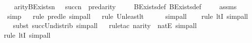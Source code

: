 \begin{isabellebody}
\ \ \ {\isachardoublequoteopen}arity{\isacharparenleft}{\kern0pt}BExists{\isacharparenleft}{\kern0pt}n{\isacharcomma}{\kern0pt}\ {\isasymphi}{\isacharparenright}{\kern0pt}{\isacharparenright}{\kern0pt}\ {\isasymle}\ succ{\isacharparenleft}{\kern0pt}n{\isacharparenright}{\kern0pt}\ {\isasymunion}\ pred{\isacharparenleft}{\kern0pt}arity{\isacharparenleft}{\kern0pt}{\isasymphi}{\isacharparenright}{\kern0pt}{\isacharparenright}{\kern0pt}{\isachardoublequoteclose}\ \isanewline
%
\isadelimproof
\isanewline
\ \ %
\endisadelimproof
%
\isatagproof
{}\isamarkupfalse%
\ BExists{\isacharunderscore}{\kern0pt}def\ BExists{\isacharprime}{\kern0pt}{\isacharunderscore}{\kern0pt}def\ \isanewline
\ \ \isamarkupfalse%
\ assms\isanewline
\ \ \isamarkupfalse%
\ simp\isanewline
\ \ \isamarkupfalse%
{\isacharparenleft}{\kern0pt}rule\ pred{\isacharunderscore}{\kern0pt}le{\isacharcomma}{\kern0pt}\ simp{\isacharunderscore}{\kern0pt}all{\isacharparenright}{\kern0pt}\isanewline
\ \ \isamarkupfalse%
{\isacharparenleft}{\kern0pt}rule\ Un{\isacharunderscore}{\kern0pt}least{\isacharunderscore}{\kern0pt}lt{\isacharparenright}{\kern0pt}{\isacharplus}{\kern0pt}\isanewline
\ \ \ \ \isamarkupfalse%
\ simp{\isacharunderscore}{\kern0pt}all\isanewline
\ \ \ \isamarkupfalse%
{\isacharparenleft}{\kern0pt}rule\ ltI{\isacharcomma}{\kern0pt}\ simp{\isacharunderscore}{\kern0pt}all{\isacharparenright}{\kern0pt}\isanewline
\ \ \isamarkupfalse%
{\isacharparenleft}{\kern0pt}subst\ succ{\isacharunderscore}{\kern0pt}Un{\isacharunderscore}{\kern0pt}distrib{\isacharcomma}{\kern0pt}\ simp{\isacharunderscore}{\kern0pt}all{\isacharparenright}{\kern0pt}\isanewline
\ \ \isamarkupfalse%
{\isacharparenleft}{\kern0pt}rule{\isacharunderscore}{\kern0pt}tac\ n{\isacharequal}{\kern0pt}{\isachardoublequoteopen}arity{\isacharparenleft}{\kern0pt}{\isasymphi}{\isacharparenright}{\kern0pt}{\isachardoublequoteclose}\ \ natE{\isacharcomma}{\kern0pt}\ simp{\isacharunderscore}{\kern0pt}all{\isacharparenright}{\kern0pt}\isanewline
\ \ \isamarkupfalse%
{\isacharparenleft}{\kern0pt}rule\ ltI{\isacharcomma}{\kern0pt}\ simp{\isacharunderscore}{\kern0pt}all{\isacharparenright}{\kern0pt}\isanewline
\ \ \isamarkupfalse%
%
\endisatagproof
{\isafoldproof}%
%
\isadelimproof
\isanewline
%
\endisadelimproof
%
\isadelimtheory
\isanewline
%
\endisadelimtheory
%
\isatagtheory
{}\isamarkupfalse%
%
\endisatagtheory
{\isafoldtheory}%
%
\isadelimtheory
%
\endisadelimtheory
%
\end{isabellebody}%
